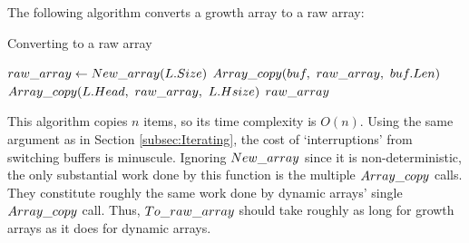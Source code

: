 \HdrGrowthArrayImpl

The following algorithm converts a growth array to a raw array:

\begin{algorithm}[H]
	\caption{Converting to a raw array \TextGrowthArray}
	\begin{algorithmic}
		\Function{$\FuncToArray$}{$\VarList$}
		\State $raw\_array \gets New\_array(L.Size)$
			\State $\FuncArrayCopy(\LclBuffer,\ \LclRawArray,\ \LclBuffer.\FieldLength)$
		\EndFor
		\State $\FuncArrayCopy(\VarList.\FieldHead,\ \LclRawArray,\ \VarList.\FieldHeadSize)$
		\State \Return $raw\_array$
		\EndFunction
	\end{algorithmic}
\end{algorithm}

This algorithm copies $n$ items, so its time complexity is $O(n)$. Using the same argument as in Section \ref{subsec:Iterating}, the cost of `interruptions' from switching buffers is minuscule. Ignoring $New\_array$ since it is non-deterministic, the only substantial work done by this function is the multiple $Array\_copy$ calls. They constitute roughly the same work done by dynamic arrays' single $Array\_copy$ call. Thus, $\FuncToArray$ should take roughly as long for growth arrays as it does for dynamic arrays.